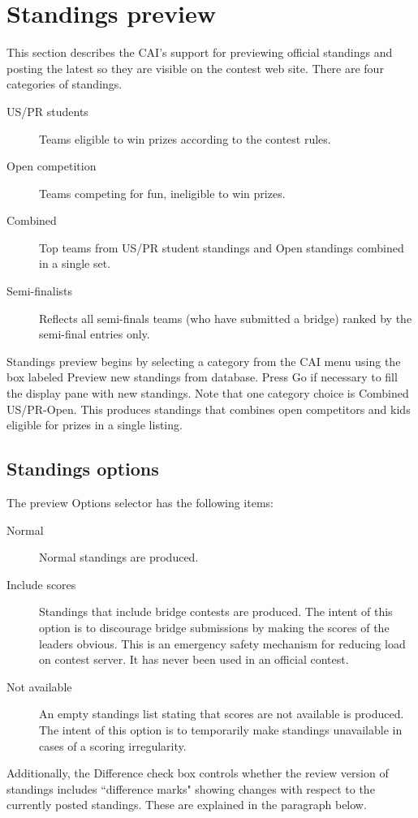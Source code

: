 \documentclass[11pt,letterpaper]{refart}
\def\ui#1{\textsf{#1}}
\begin{document}
\section{Standings preview}
This section describes the CAI's support for previewing official standings and posting
the latest so they are visible on the contest web site.  There are four categories of
standings.
\begin{description}
\item[US/PR students] Teams eligible to win prizes according to the contest rules.
\item[Open competition] Teams competing for fun, ineligible to win prizes.
\item[Combined] Top teams from US/PR student standings and Open standings
combined in a single set. 
\item[Semi-finalists] Reflects all semi-finals teams (who have submitted a bridge) ranked
by the semi-final entries only.
\end{description}

Standings preview begins by selecting a category from the CAI menu using the box labeled
\ui{Preview new standings from database}.  Press \ui{Go} if necessary to fill
the display pane with new standings.  Note that one category choice is 
\ui{Combined US/PR-Open}. This produces standings that combines open competitors and
kids eligible for prizes in a single listing.  

\subsection{Standings options}
The preview \ui{Options} selector has the following items:
\begin{description}
\item[Normal] Normal standings are produced.
\item[Include scores] Standings that include bridge contests are produced. The intent of this
option is to discourage bridge submissions by making the scores of the leaders obvious. This is an
emergency safety mechanism for reducing load on contest server. It has never been used in
an official contest.
\item[Not available] An empty standings list stating that scores are not available is produced.
The intent of this option is to temporarily make standings unavailable in cases of a scoring
irregularity.
\end{description} 
Additionally, the \ui{Difference} check box controls whether the review version of standings
includes ``difference marks" showing changes with respect to the currently posted standings.
These are explained in the paragraph below.
\end{document}
